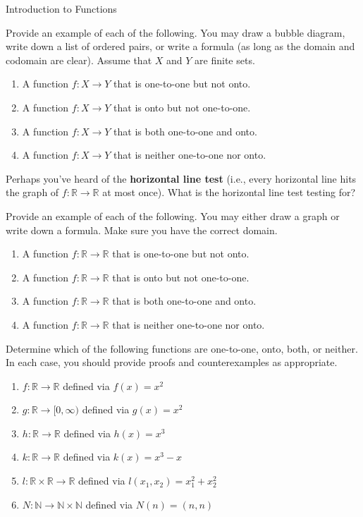 \begin{section}{Introduction to Functions}
\begin{exercise}
Provide an example of each of the following.  You may draw a bubble diagram, write down a list of ordered pairs, or write a formula (as long as the domain and codomain are clear).  Assume that $X$ and $Y$ are finite sets.
\begin{enumerate}[label=\textrm{(\alph*)}]
\item A function $f:X\to Y$ that is one-to-one but not onto.
\item A function $f:X\to Y$ that is onto but not one-to-one.
\item A function $f:X\to Y$ that is both one-to-one and onto.
\item A function $f:X\to Y$ that is neither one-to-one nor onto.
\end{enumerate}

\end{exercise}

\begin{problem}
Perhaps you've heard of the \textbf{horizontal line test} (i.e., every horizontal line hits the graph of $f:\mathbb{R}\to\mathbb{R}$ at most once).  What is the horizontal line test testing for?
\end{problem}

\begin{exercise}
Provide an example of each of the following.  You may either draw a graph or write down a formula.  Make sure you have the correct domain.
\begin{enumerate}[label=\textrm{(\alph*)}]
\item A function $f:\mathbb{R}\to \mathbb{R}$ that is one-to-one but not onto.
\item A function $f:\mathbb{R}\to \mathbb{R}$ that is onto but not one-to-one.
\item A function $f:\mathbb{R}\to \mathbb{R}$ that is both one-to-one and onto.
\item A function $f:\mathbb{R}\to \mathbb{R}$ that is neither one-to-one nor onto.
\end{enumerate}
\end{exercise}

\begin{exercise}
Determine which of the following functions are one-to-one, onto, both, or neither.  In each case, you should provide proofs and counterexamples as appropriate.
\begin{enumerate}[label=\textrm{(\alph*)}]
\item $f:\mathbb{R}\to \mathbb{R}$ defined via $f(x)=x^{2}$
\item $g:\mathbb{R}\to [0,\infty)$ defined via $g(x)=x^{2}$
\item $h:\mathbb{R}\to \mathbb{R}$ defined via $h(x)=x^{3}$
\item $k:\mathbb{R}\to \mathbb{R}$ defined via $k(x)=x^{3}-x$
\item $l: \mathbb{R}\times \mathbb{R}\to \mathbb{R}$ defined via $l(x_{1},x_{2})=x_{1}^{2}+x_{2}^{2}$
\item $N:\mathbb{N}\to \mathbb{N}\times \mathbb{N}$ defined via $N(n)=(n,n)$
\end{enumerate}
\end{exercise}


\end{section}
